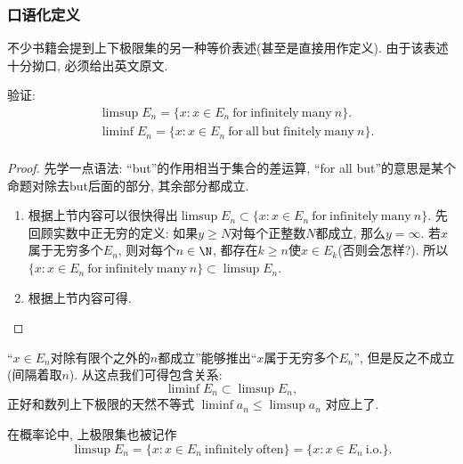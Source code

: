 \subsubsection{口语化定义}
不少书籍会提到上下极限集的另一种等价表述(甚至是直接用作定义). 由于该表述十分拗口, 必须给出英文原文.
\begin{example}
    验证:
    \begin{align*}
    &\limsup E_n = \{x: x\in E_n \mathrm{~for~infinitely~many~}n\}. \\
    &\liminf E_n = \{x: x\in E_n \mathrm{~for~all~but~finitely~many~}n\}. \\
    \end{align*}
\end{example}
\begin{proof}
    先学一点语法: “but”的作用相当于集合的差运算, “for all but”的意思是某个命题对除去but后面的部分, 其余部分都成立. 
    \begin{enumerate}
    \item 根据上节内容可以很快得出$\limsup E_n \subset \{x: x\in E_n \mathrm{~for~infinitely~many~}n\}$. 先回顾实数中正无穷的定义: 如果$y\geq N$对每个正整数$N$都成立, 那么$y=\infty$. 若$x$属于无穷多个$E_n$, 则对每个$n \in \N$, 都存在$k \geq n$使$x \in E_k$(否则会怎样?). 所以$\{x: x\in E_n \mathrm{~for~infinitely~many~}n\} \subset \limsup E_n$. 
    \item 根据上节内容可得.
    \end{enumerate}
\end{proof}
\begin{remark}
    “$x \in E_n$对除有限个之外的$n$都成立”能够推出“$x$属于无穷多个$E_n$”, 但是反之不成立(间隔着取$n$). 从这点我们可得包含关系:
    $$ \liminf E_n \subset \limsup E_n, $$
    正好和数列上下极限的天然不等式
    $\liminf a_n \leq \limsup a_n$ 对应上了. 
    
    在概率论中, 上极限集也被记作
    $$\limsup E_n = \{x: x\in E_n \mathrm{~infinitely~often}\}=\{x: x\in E_n \mathrm{~i.o.}\}.$$
\end{remark}